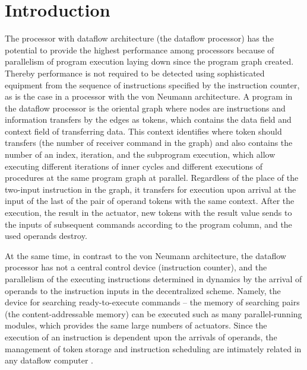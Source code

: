 \documentclass[
11pt,%
tightenlines,%
twoside,%
onecolumn,%
nofloats,%
nobibnotes,%
nofootinbib,%
superscriptaddress,%
noshowpacs,%
centertags]%
{revtex4}
\begin{document}


\maketitle

\section{Introduction}

The processor with dataflow architecture (the dataflow processor) has the potential to provide the highest performance among processors because of parallelism of program execution laying down since the program graph created.
Thereby performance is not required to be detected using sophisticated equipment from the sequence of instructions specified by the instruction counter, as is the case in a processor with the von Neumann architecture.
A program in the dataflow processor is the oriental graph where nodes are instructions and information transfers by the edges as tokens, which contains the data field and context field of transferring data.
This context identifies where token should transfers (the number of receiver command in the graph) and also contains the number of an index, iteration, and the subprogram execution, which allow executing different iterations of inner cycles and different executions of procedures at the same program graph at parallel.
Regardless of the place of the two-input instruction in the graph, it transfers for execution upon arrival at the input of the last of the pair of operand tokens with the same context.
After the execution, the result in the actuator, new tokens with the result value sends to the inputs of subsequent commands according to the program column, and the used operands destroy.

At the same time, in contrast to the von Neumann architecture, the dataflow processor has not a central control device (instruction counter), and the parallelism of the executing instructions determined in dynamics by the arrival of operands to the instruction inputs in the decentralized scheme.
Namely, the device for searching ready-to-execute commands -- the memory of searching pairs (the content-addressable memory) can be executed such as many parallel-running modules, which provides the same large numbers of actuators. Since the execution of an instruction is dependent upon the arrivals of operands, the management of token storage and instruction scheduling are intimately related in any dataflow computer \cite{fine-grained-prl,culler}.
\end{document}
